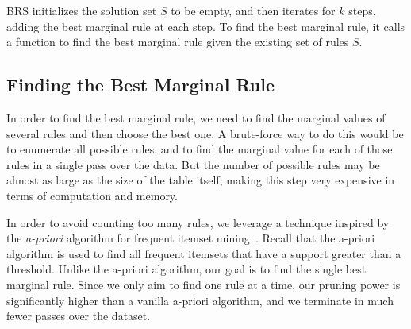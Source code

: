 \documentclass[10pt,journal,compsoc]{IEEEtran}
\begin{document}

BRS initializes the solution set $S$ to be empty, and then iterates for $k$ steps, adding the best marginal rule at each step. To find the best marginal rule, it calls a function to find the best marginal rule given the existing set of rules $S$. 

\subsection{Finding the Best Marginal Rule}\label{sec:finding-best-marginal}
In order to find the best marginal rule, we need to find the marginal values of several rules and then choose the best one. A brute-force way to do this would be to enumerate all possible rules, and to find the marginal value for each of those rules in a single pass over the data. But the number of possible rules may be almost as large as the size of the table itself, making this step very expensive in terms of computation and memory. 

In order to avoid counting too many rules, we leverage a technique inspired by the {\em a-priori} algorithm for frequent itemset mining~\cite{apriori}. Recall that the a-priori algorithm is used to find all frequent itemsets that have a support greater than a threshold. Unlike the a-priori algorithm, our goal is to find the single best marginal rule. Since we only aim to find one rule at a time, our pruning power is significantly higher than a vanilla a-priori algorithm, and we terminate in much fewer passes over the dataset. 
\end{document}
